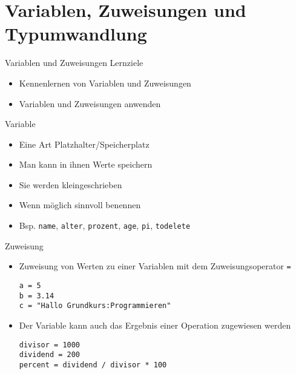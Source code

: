 \section{Variablen, Zuweisungen und Typumwandlung}

\begin{frame}[fragile]{Variablen und Zuweisungen}
Lernziele
\begin{itemize}
	\item Kennenlernen von Variablen und Zuweisungen
	\item Variablen und Zuweisungen anwenden

\end{itemize}
\end{frame}

\begin{frame}[fragile]{Variable}
\begin{itemize}
	\item Eine Art Platzhalter/Speicherplatz
	\item Man kann in ihnen Werte speichern
	\item Sie werden kleingeschrieben
	\item Wenn möglich sinnvoll benennen
	\item Bsp. \texttt{name}, \texttt{alter}, \texttt{prozent}, \texttt{age}, \texttt{pi}, \texttt{todelete}
	
\end{itemize}
\end{frame}


\begin{frame}[fragile]{Zuweisung}
\begin{itemize}
\item Zuweisung von Werten zu einer Variablen mit dem Zuweisungsoperator \texttt{=}
\begin{lstlisting}
a = 5
b = 3.14 
c = "Hallo Grundkurs:Programmieren"
\end{lstlisting}
\item Der Variable kann auch das Ergebnis einer Operation zugewiesen werden
\begin{lstlisting}
divisor = 1000
dividend = 200
percent = dividend / divisor * 100
\end{lstlisting}

\end{itemize}
\end{frame}



